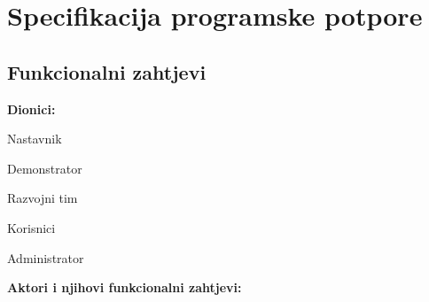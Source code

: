 \chapter{Specifikacija programske potpore}
		
	\section{Funkcionalni zahtjevi}
			
			
				
			
			
			\noindent \textbf{Dionici:}
			
			\begin{packed_enum}
				
				\item Nastavnik
				\item Demonstrator 
				\item Razvojni tim
				\item Korisnici
				\item Administrator
				
			\end{packed_enum}
			
			\noindent \textbf{Aktori i njihovi funkcionalni zahtjevi:}
			
